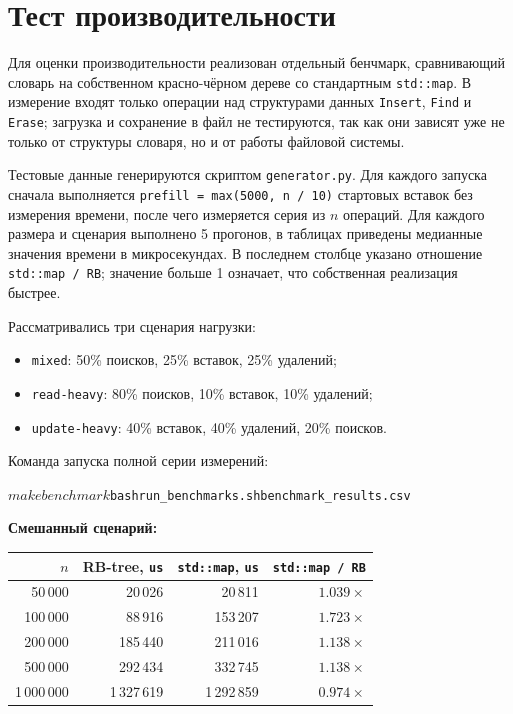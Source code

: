 \section{Тест производительности}

Для оценки производительности реализован отдельный бенчмарк, сравнивающий словарь на собственном красно-чёрном дереве со стандартным \texttt{std::map}. В измерение входят только операции над структурами данных \texttt{Insert}, \texttt{Find} и \texttt{Erase}; загрузка и сохранение в файл не тестируются, так как они зависят уже не только от структуры словаря, но и от работы файловой системы.

Тестовые данные генерируются скриптом \texttt{generator.py}. Для каждого запуска сначала выполняется \texttt{prefill = max(5000, n / 10)} стартовых вставок без измерения времени, после чего измеряется серия из $n$ операций. Для каждого размера и сценария выполнено 5 прогонов, в таблицах приведены медианные значения времени в микросекундах. В последнем столбце указано отношение \texttt{std::map / RB}; значение больше 1 означает, что собственная реализация быстрее.

Рассматривались три сценария нагрузки:
\begin{itemize}
\item \texttt{mixed}: 50\% поисков, 25\% вставок, 25\% удалений;
\item \texttt{read-heavy}: 80\% поисков, 10\% вставок, 10\% удалений;
\item \texttt{update-heavy}: 40\% вставок, 40\% удалений, 20\% поисков.
\end{itemize}

Команда запуска полной серии измерений:
\begin{alltt}
$ make benchmark
$ bash run_benchmarks.sh benchmark_results.csv
\end{alltt}

\textbf{Смешанный сценарий:}
\begin{longtable}{|r|r|r|r|}
\hline
\rowcolor{lightgray}
$n$ & RB-tree, \texttt{us} & \texttt{std::map}, \texttt{us} & \texttt{std::map / RB} \\
\hline
50\,000 & 20\,026 & 20\,811 & $1.039\times$ \\
\hline
100\,000 & 88\,916 & 153\,207 & $1.723\times$ \\
\hline
200\,000 & 185\,440 & 211\,016 & $1.138\times$ \\
\hline
500\,000 & 292\,434 & 332\,745 & $1.138\times$ \\
\hline
1\,000\,000 & 1\,327\,619 & 1\,292\,859 & $0.974\times$ \\
\hline
\end{longtable}

